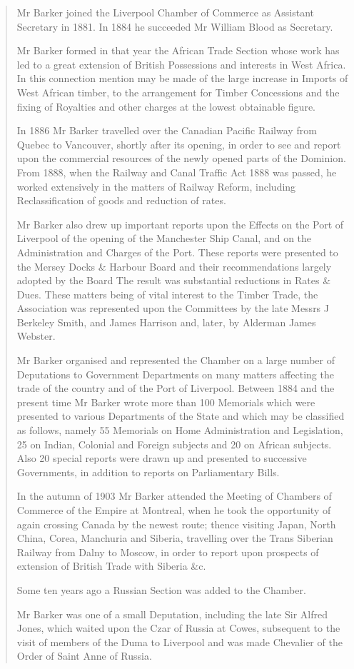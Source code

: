 \begin{quotation}
Mr Barker joined the Liverpool Chamber of Commerce as Assistant Secretary in 1881. In 1884 he succeeded Mr William Blood as Secretary.

Mr Barker formed in that year the African Trade Section whose work has led to a great extension of British Possessions and interests in West Africa. In this connection mention may be made of the large increase in Imports of West African timber, to the arrangement for Timber Concessions and the fixing of Royalties and other charges at the lowest obtainable figure.

In 1886 Mr Barker travelled over the Canadian Pacific Railway from Quebec to Vancouver, shortly after its opening, in order to see and report upon the commercial resources of the newly opened parts of the Dominion. From 1888, when the Railway and Canal Traffic Act 1888 was passed, he worked extensively in the matters of Railway Reform, including Reclassification of goods and reduction of rates.

Mr Barker also drew up important reports upon the Effects on the Port of Liverpool of the opening of the Manchester Ship Canal, and on the Administration and Charges of the Port. These reports were presented to the Mersey Docks \& Harbour Board and their recommendations largely adopted by the Board The result was substantial reductions in Rates \& Dues. These matters being of vital interest to the Timber Trade, the Association was represented upon the Committees by the late Messrs J Berkeley Smith, and James Harrison and, later, by Alderman James Webster.

Mr Barker organised and represented the Chamber on a large number of Deputations to Government Departments on many matters affecting the trade of the country and of the Port of Liverpool. Between 1884 and the present time Mr Barker wrote more than 100 Memorials which were presented to various Departments of the State and which may be classified as follows, namely 55 Memorials on Home Administration and Legislation, 25 on Indian, Colonial and Foreign subjects and 20 on African subjects. Also 20 special reports were drawn up and presented to successive Governments, in addition to reports on Parliamentary Bills.

In the autumn of 1903 Mr Barker attended the Meeting of Chambers of Commerce of the Empire at Montreal, when he took the opportunity of again crossing Canada by the newest route; thence visiting Japan, North China, Corea, Manchuria and Siberia, travelling over the Trans Siberian Railway from Dalny to Moscow, in order to report upon prospects of extension of British Trade with Siberia \&c.

Some ten years ago a Russian Section was added to the Chamber.

Mr Barker was one of a small Deputation, including the late Sir Alfred Jones, which waited upon the Czar of Russia at Cowes, subsequent to the visit of members of the Duma to Liverpool and was made Chevalier of the Order of Saint Anne of Russia.
\end{quotation}

